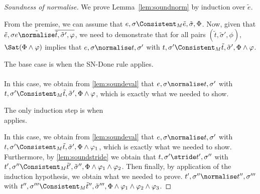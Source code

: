 \begin{proof}[Soundness of normalise]
  We prove Lemma~\ref{lem:soundnorm} by induction over $\tilde{e}$.

  From the premise, we can assume that $e,\sigma\Consistent_M\tilde{e},\tilde{\sigma},\Phi$.
  Now, given that $\tilde{e},\sigma{e}\tilde{\normalise} \overline{\tilde{t},\tilde{\sigma}',\phi}$,
  we need to demonstrate that for all pairs $(\tilde{t},\tilde{\sigma}',\phi)$,
  $\Sat(\Phi\land\phi)$ implies that $e,\sigma\normalise t,\sigma'$ with $t,\sigma'\Consistent_M\tilde{t},\tilde{\sigma}',\Phi\land\phi$.

The base case is when the SN-Done rule applies.\\
\\

In this case, we obtain from \cref{lem:soundeval} that
$e,\sigma\normalise t,\sigma'$ with $t,\sigma'\Consistent_M\tilde{t},\tilde{\sigma}',\Phi\land\phi$,
which is exactly what we needed to show.

The only induction step is when\\
 applies.

In this case, we obtain from \cref{lem:soundeval} that
$e,\sigma\normalise t,\sigma'$ with $t,\sigma'\Consistent_M\tilde{t},\tilde{\sigma}',\Phi\land\phi_1$,
which is exactly what we needed to show.
Furthermore, by \cref{lem:soundstride} we obtain that
$t,\sigma'\stride t',\sigma''$ with $t',\sigma''\Consistent_M\tilde{t}',\tilde{\sigma}'',\Phi\land\phi_1\land\phi_2$.
Then finally, by application of the induction hypothesis, we obtain what we needed to prove.
$t',\sigma''\normalise t'',\sigma'''$ with $t'',\sigma'''\Consistent_M\tilde{t}'',\tilde{\sigma}''',\Phi\land\phi_1\land\phi_2\land\phi_3$.

\end{proof}

